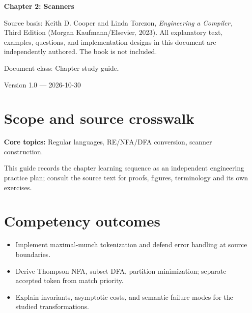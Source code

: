 \documentclass[10pt,letterpaper]{article}
\begin{document}
\begin{titlepage}
\centering\vspace*{1.0in}
{\Huge\bfseries\textcolor{CompilerBlue}{Chapter 2: Scanners}\par}
\vspace{.22in}{\Large Critical reading, original exercises, evidence and review\par}
\vspace{.4in}{\large Compiler Engineering Documentation Suite\par}
\vfill
\begin{minipage}{.86\linewidth}\small
Source basis: Keith D. Cooper and Linda Torczon, \emph{Engineering a Compiler}, Third Edition (Morgan Kaufmann/Elsevier, 2023). All explanatory text, examples, questions, and implementation designs in this document are independently authored. The book is not included.\par\medskip
Document class: Chapter study guide.
\end{minipage}
\vfill\textcolor{CompilerGray}{Version 1.0 --- 2026-10-30}\par
\end{titlepage}
\tableofcontents\clearpage
\section{Scope and source crosswalk}
\textbf{Core topics:} Regular languages, RE/NFA/DFA conversion, scanner construction.

This guide records the chapter learning sequence as an independent engineering practice plan; consult the source text for proofs, figures, terminology and its own exercises.

\section{Competency outcomes}
\begin{itemize}
\item Implement maximal-munch tokenization and defend error handling at source boundaries.
\item Derive Thompson NFA, subset DFA, partition minimization; separate accepted token from match priority.
\item Explain invariants, asymptotic costs, and semantic failure modes for the studied transformations.
\end{itemize}
\end{document}
